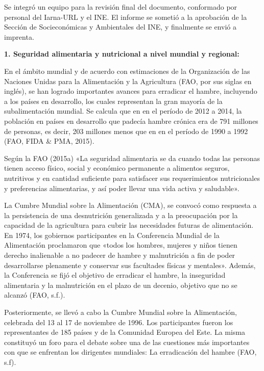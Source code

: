 Se integró un equipo para la revisión final del documento, conformado por personal del Iarna-URL y el INE. El informe se sometió a la aprobación de la Sección de Socieconómicas y Ambientales del INE, y finalmente se envió a imprenta.



%

\newpage



\noindent\textbf{1. Seguridad alimentaria y nutricional a nivel mundial y regional:}

En el ámbito mundial y de acuerdo con estimaciones de la Organización de las Naciones Unidas para la Alimentación y la Agricultura (FAO, por sus siglas en inglés), se han logrado importantes avances para erradicar el hambre, incluyendo a los países en desarrollo, los cuales representan la gran mayoría de la subalimentación mundial. Se calcula que en en el período de 2012 a 2014, la población en países en desarrollo que padecía hambre crónica era de 791 millones de personas, es decir, 203 millones menos que en en el período de 1990 a 1992 (FAO, FIDA \& PMA, 2015). 

Según la FAO (2015a) «La seguridad alimentaria se da cuando todas las personas tienen acceso físico, social y económico permanente a alimentos seguros, nutritivos y en cantidad suficiente para satisfacer sus requerimientos nutricionales y preferencias alimentarias, y así poder llevar una vida activa y saludable».

La Cumbre Mundial sobre la Alimentación (CMA), se convocó como respuesta a la persistencia de una desnutrición generalizada y a la preocupación por la capacidad de la agricultura para cubrir las necesidades futuras de alimentación. En 1974, los gobiernos participantes en la Conferencia Mundial de la Alimentación proclamaron que «todos los hombres, mujeres y niños tienen derecho inalienable a no padecer de hambre y malnutrición a fin de poder desarrollarse plenamente y conservar sus facultades físicas y mentales». Además, la Conferencia se fijó el objetivo de erradicar el hambre, la inseguridad alimentaria y la malnutrición en el plazo de un decenio, objetivo que no se alcanzó (FAO, s.f.).  

Posteriormente, se llevó a cabo la Cumbre Mundial sobre la Alimentación, celebrada del 13 al 17 de noviembre de 1996. Los participantes fueron los representantes de 185 países y de la Comunidad Europea del Este. La misma constituyó un foro para el debate sobre una de las cuestiones más importantes con que se enfrentan los dirigentes mundiales: La erradicación del hambre (FAO, s.f).

